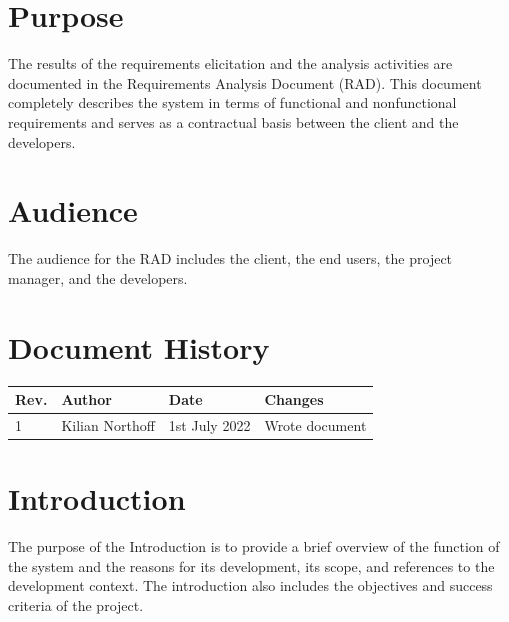 \documentclass[a4paper,12pt,halfparskip]{scrartcl}
\begin{document}
    \section*{Purpose}
    The results of the requirements elicitation and the analysis activities are documented in the Requirements Analysis Document (RAD).
    This document completely describes the system in terms of functional and nonfunctional requirements and serves as a contractual basis between the client and the developers.

    \section*{Audience}
    The audience for the RAD includes the client, the end users, the project manager, and the developers.
    \nopagebreak

    \renewcommand{\contentsname}{Table of Contents}
    \tableofcontents

    \section*{Document History}

    \begin{tabular}{
        |p{}%
        |p{}%
        |p{}
        |p{}|%
    }
        \hline
        Rev. & Author          & Date          & Changes        \\
        \hline
        1    & Kilian Northoff & 1st July 2022 & Wrote document \\
        \hline
    \end{tabular}
    \newpage
    \sectionfont{\color[HTML]{355a8a}}
    \subsectionfont{\color[HTML]{4e81bc}}
    \subsubsectionfont{\color[HTML]{6b96c7}}


    \section{Introduction}
    The purpose of the Introduction is to provide a brief overview of the function of the system and the reasons for its
    development, its scope, and references to the development context.
    The introduction also includes the objectives and success criteria of the project.
\end{document}
